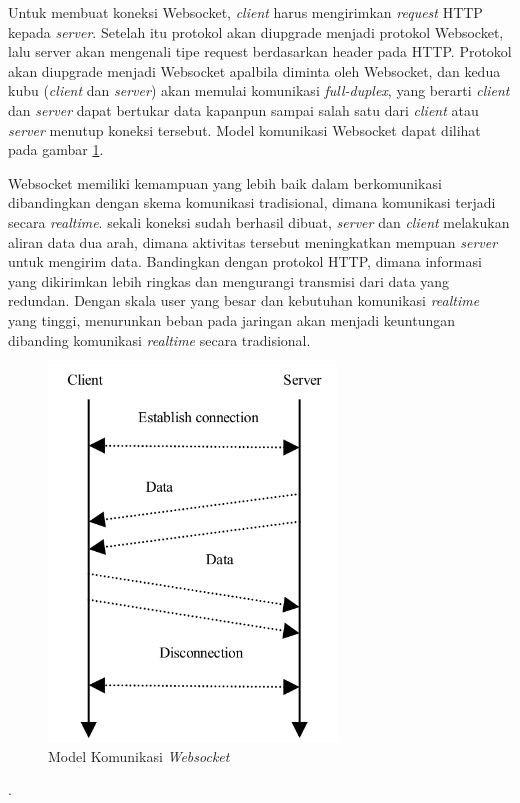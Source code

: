            	Untuk membuat koneksi Websocket, \textit{client} harus mengirimkan \textit{request} HTTP kepada \textit{server}. Setelah itu protokol akan diupgrade menjadi protokol Websocket, lalu server akan mengenali tipe request berdasarkan header pada HTTP. Protokol akan diupgrade menjadi Websocket apalbila diminta oleh Websocket, dan kedua kubu (\textit{client} dan \textit{server}) akan memulai komunikasi \textit{full-duplex}, yang berarti \textit{client} dan \textit{server} dapat bertukar data kapanpun sampai salah satu dari \textit{client} atau \textit{server} menutup koneksi tersebut. Model komunikasi Websocket dapat dilihat pada gambar \ref{websocketmodel}.
           		
           	Websocket memiliki kemampuan yang lebih baik dalam berkomunikasi dibandingkan dengan skema komunikasi tradisional, dimana komunikasi terjadi secara \textit{realtime}. sekali koneksi sudah berhasil dibuat, \textit{server} dan \textit{client} melakukan aliran data dua arah, dimana aktivitas tersebut meningkatkan mempuan \textit{server} untuk mengirim data. Bandingkan dengan protokol HTTP, dimana informasi yang dikirimkan lebih ringkas dan mengurangi transmisi dari data yang redundan. Dengan skala user yang besar dan kebutuhan komunikasi \textit{realtime} yang tinggi, menurunkan beban pada jaringan akan menjadi keuntungan dibanding komunikasi \textit{realtime} secara tradisional.
           	\begin{figure}[H]
           		\centering
           		\includegraphics[height=10cm]{Images/C-2/websocket.png}
           		\caption{Model Komunikasi \textit{Websocket}}
           		\label{websocketmodel}
           	\end{figure}
           	\cite{boettiger_introduction_2015}.
